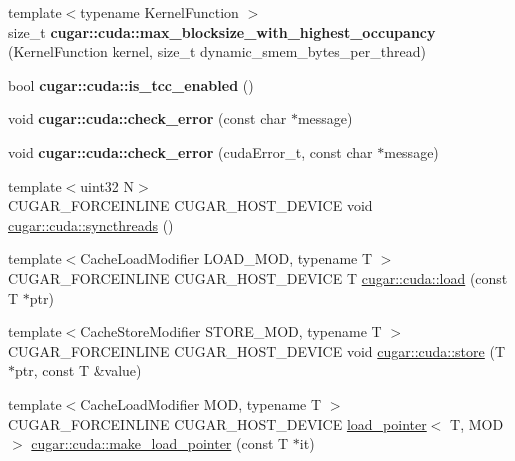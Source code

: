 \begin{DoxyCompactItemize}
{\footnotesize template$<$typename Kernel\+Function $>$ }\\size\+\_\+t {\bfseries cugar\+::cuda\+::max\+\_\+blocksize\+\_\+with\+\_\+highest\+\_\+occupancy} (Kernel\+Function kernel, size\+\_\+t dynamic\+\_\+smem\+\_\+bytes\+\_\+per\+\_\+thread)
\item 
\mbox{\label{group___c_u_d_a_module_ga1d8a68a3ac2a40d4bae0c5660dcc9f71}} 
bool {\bfseries cugar\+::cuda\+::is\+\_\+tcc\+\_\+enabled} ()
\item 
\mbox{\label{group___c_u_d_a_module_ga724d6ebb15325362de7766252ac944a3}} 
void {\bfseries cugar\+::cuda\+::check\+\_\+error} (const char $\ast$message)
\item 
\mbox{\label{group___c_u_d_a_module_gadd534b6563f35f723ceb20912f2357f1}} 
void {\bfseries cugar\+::cuda\+::check\+\_\+error} (cuda\+Error\+\_\+t, const char $\ast$message)
\item 
{\footnotesize template$<$uint32 N$>$ }\\C\+U\+G\+A\+R\+\_\+\+F\+O\+R\+C\+E\+I\+N\+L\+I\+NE C\+U\+G\+A\+R\+\_\+\+H\+O\+S\+T\+\_\+\+D\+E\+V\+I\+CE void \hyperlink{group___c_u_d_a_module_ga7cd39b01cdfc18283bcd4bee3fabcaf9}{cugar\+::cuda\+::syncthreads} ()
\item 
{\footnotesize template$<$Cache\+Load\+Modifier L\+O\+A\+D\+\_\+\+M\+OD, typename T $>$ }\\C\+U\+G\+A\+R\+\_\+\+F\+O\+R\+C\+E\+I\+N\+L\+I\+NE C\+U\+G\+A\+R\+\_\+\+H\+O\+S\+T\+\_\+\+D\+E\+V\+I\+CE T \hyperlink{group___c_u_d_a_module_ga2786ba75af2a254c03f272b6211b6379}{cugar\+::cuda\+::load} (const T $\ast$ptr)
\item 
{\footnotesize template$<$Cache\+Store\+Modifier S\+T\+O\+R\+E\+\_\+\+M\+OD, typename T $>$ }\\C\+U\+G\+A\+R\+\_\+\+F\+O\+R\+C\+E\+I\+N\+L\+I\+NE C\+U\+G\+A\+R\+\_\+\+H\+O\+S\+T\+\_\+\+D\+E\+V\+I\+CE void \hyperlink{group___c_u_d_a_module_ga472f45d1a143f42df19bab271121f481}{cugar\+::cuda\+::store} (T $\ast$ptr, const T \&value)
\item 
{\footnotesize template$<$Cache\+Load\+Modifier M\+OD, typename T $>$ }\\C\+U\+G\+A\+R\+\_\+\+F\+O\+R\+C\+E\+I\+N\+L\+I\+NE C\+U\+G\+A\+R\+\_\+\+H\+O\+S\+T\+\_\+\+D\+E\+V\+I\+CE \hyperlink{structcugar_1_1cuda_1_1load__pointer}{load\+\_\+pointer}$<$ T, M\+OD $>$ \hyperlink{group___c_u_d_a_module_ga985b1000130fbe4bc8fdc5191499f69e}{cugar\+::cuda\+::make\+\_\+load\+\_\+pointer} (const T $\ast$it)

\end{DoxyCompactItemize}
